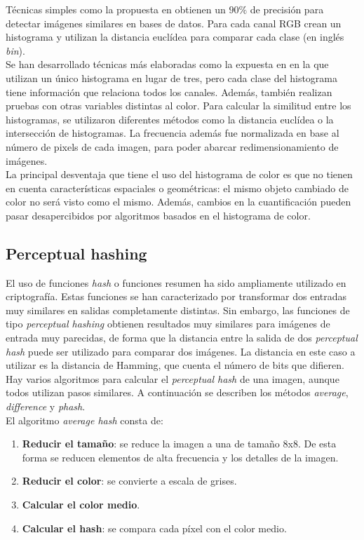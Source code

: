 Técnicas simples como la propuesta en \cite{jain:1996} obtienen un $90\%$ de precisión para detectar imágenes similares en bases de datos. Para cada canal RGB crean un histograma y utilizan la distancia euclídea para comparar cada clase (en inglés \textit{bin}). \\

Se han desarrollado técnicas más elaboradas como la expuesta en \cite{jeong:2001} en la que utilizan un único histograma en lugar de tres, pero cada clase del histograma tiene información que relaciona todos los canales. Además, también realizan pruebas con otras variables distintas al color. Para calcular la similitud entre los histogramas, se utilizaron diferentes métodos como la distancia euclídea o la intersección de histogramas. La frecuencia además fue normalizada en base al número de pixels de cada imagen, para poder abarcar redimensionamiento de imágenes. \\

La principal desventaja que tiene el uso del histograma de color es que no tienen en cuenta características espaciales o geométricas: el mismo objeto cambiado de color no será visto como el mismo. Además, cambios en la cuantificación pueden pasar desapercibidos por algoritmos basados en el histograma de color. \\

\subsection{Perceptual hashing}
El uso de funciones \textit{hash} o funciones resumen ha sido ampliamente utilizado en criptografía. Estas funciones se han caracterizado por transformar dos entradas muy similares en salidas completamente distintas. Sin embargo, las funciones de tipo \textit{perceptual hashing} obtienen resultados muy similares para imágenes de entrada muy parecidas, de forma que la distancia entre la salida de dos \textit{perceptual hash} puede ser utilizado para comparar dos imágenes. La distancia en este caso a utilizar es la distancia de Hamming, que cuenta el número de bits que difieren.\\

Hay varios algoritmos para calcular el \textit{perceptual hash} de una imagen, aunque todos utilizan pasos similares. A continuación se describen los métodos \textit{average}, \textit{difference} y \textit{phash}. \\

El algoritmo \textit{average hash} consta de:
\begin{enumerate}
\item \textbf{Reducir el tama\~no}: se reduce la imagen a una de tama\~no $8$x$8$. De esta forma se reducen elementos de alta frecuencia y los detalles de la imagen.
\item \textbf{Reducir el color}: se convierte a escala de grises.
\item \textbf{Calcular el color medio}.
\item \textbf{Calcular el hash}: se compara cada píxel con el color medio.
\end{enumerate} 

